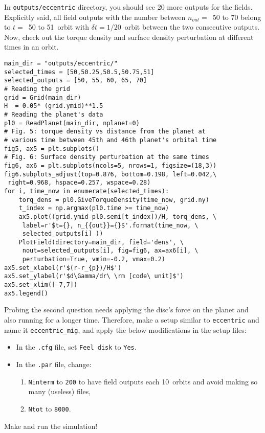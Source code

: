 \documentclass[14pt]{scrartcl}
\begin{document}
In \texttt{outputs/eccentric} directory, you should see 20 more outputs for the fields. Explicitly said, all field outputs with the number between $n_{out}=$~50 to 70 belong to $t=$~50 to 51~orbit with $\delta t=1/20$~orbit between the two consecutive outputs. Now, check out the torque density and surface density perturbation at different times in an orbit.
	\begin{verbatim}
main_dir = "outputs/eccentric/"
selected_times = [50,50.25,50.5,50.75,51]
selected_outputs = [50, 55, 60, 65, 70]
# Reading the grid
grid = Grid(main_dir)
H  = 0.05* (grid.ymid)**1.5
# Reading the planet's data
pl0 = ReadPlanet(main_dir, nplanet=0)
# Fig. 5: torque density vs distance from the planet at 
# various time between 45th and 46th planet's orbital time
fig5, ax5 = plt.subplots()
# Fig. 6: Surface density perturbation at the same times
fig6, ax6 = plt.subplots(ncols=5, nrows=1, figsize=(18,3))
fig6.subplots_adjust(top=0.876, bottom=0.198, left=0.042,\
 right=0.968, hspace=0.257, wspace=0.28)
for i, time_now in enumerate(selected_times):
    torq_dens = pl0.GiveTorqueDensity(time_now, grid.ny)
    t_index = np.argmax(pl0.time >= time_now)
    ax5.plot((grid.ymid-pl0.semi[t_index])/H, torq_dens, \
     label=r'$t={}, n_{{out}}={}$'.format(time_now, \
     selected_outputs[i] ))
    PlotField(directory=main_dir, field='dens', \
     nout=selected_outputs[i], fig=fig6, ax=ax6[i], \
     perturbation=True, vmin=-0.2, vmax=0.2)
ax5.set_xlabel(r'$(r-r_{p})/H$')
ax5.set_ylabel(r'$d\Gamma/dr\ \rm [code\ unit]$')
ax5.set_xlim([-7,7])
ax5.legend()

\end{verbatim}

Probing the second question needs applying the disc's force on the planet and also running for a longer time. Therefore, make a setup similar to \texttt{eccentric} and name it \texttt{eccentric\_mig}, and apply the below modifications in the setup files:
\begin{itemize}
	\item In the \texttt{.cfg} file, set \texttt{Feel disk} to \texttt{Yes}.
	\item In the \texttt{.par} file, change:
	\begin{enumerate}
		\item \texttt{Ninterm} to \texttt{200} to have field outputs each 10~orbits and avoid making so many (useless) files,
		\item \texttt{Ntot} to \texttt{8000}.
	\end{enumerate}
\end{itemize}
Make and run the simulation!
\end{document}
